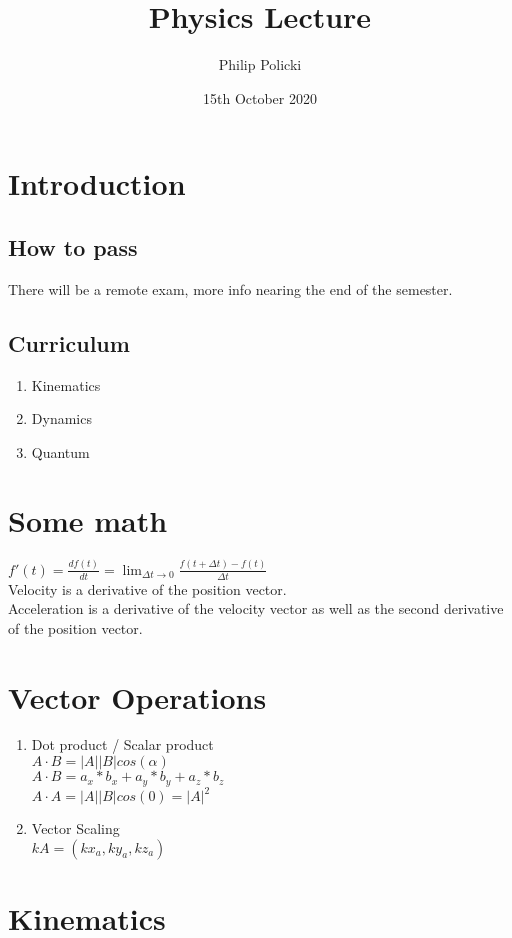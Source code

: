 \documentclass{article}
\title{Physics Lecture }
\author{Philip Policki}
\date{15th October 2020}
\begin{document}
\maketitle
\tableofcontents
\pagebreak

\section{Introduction}
\subsection{How to pass}
There will be a remote exam, more info nearing the end of the semester.
\subsection{Curriculum}
\begin{enumerate}
	\item Kinematics
	\item Dynamics
	\item Quantum
\end{enumerate}

\section{Some math}
$ f'(t) = \frac{df(t)}{dt} = \lim_{\Delta t\to 0} \frac{f(t+\Delta t) - f(t)}{\Delta t}$ \\
Velocity is a derivative of the position vector. \\
Acceleration is a derivative of the velocity vector as well as the second derivative of the position vector. \\

\section{Vector Operations}
\begin{enumerate}
	\item Dot product / Scalar product \\
	$ A \cdot B = |A||B|cos(\alpha)$ \\
	$ A \cdot B = a_x * b_x + a_y * b_y + a_z * b_z$ \\ 
	$ A \cdot A = |A||B|cos(0) = |A|^2$
	\item Vector Scaling \\
	$ kA = (kx_a, ky_a, kz_a)$
\end{enumerate}
\section{Kinematics}
\end{document}
